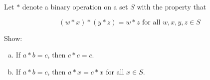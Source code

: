 Let $\ast$ denote a binary operation on a set $S$ with the property that

$$
  (w \ast x) \ast (y \ast z) = w \ast z \text{ for all } w, x, y, z \in S
$$

Show:

\begin{enumerate}[(a)]

\item If $a \ast b = c$, then $c \ast c = c$.
\item If $a \ast b = c$, then $a \ast x = c \ast x$ for all $x \in S$.

\end{enumerate}
